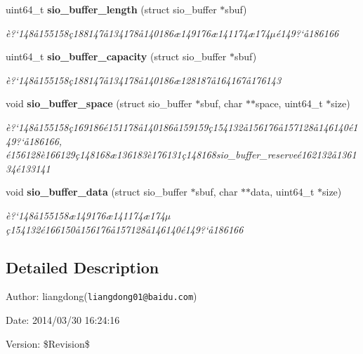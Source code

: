 \begin{CompactItemize}
uint64\_\-t {\bf sio\_\-buffer\_\-length} (struct sio\_\-buffer $\ast$sbuf)
\begin{CompactList}\small\item\em \`{e}?`148\aa{}155158\c{c}188147\aa{}134178\aa{}140186\ae{}149176\ae{}141174\ae{}174$\mu$\'{e}149?`\aa{}186166 \item\end{CompactList}\item 
uint64\_\-t {\bf sio\_\-buffer\_\-capacity} (struct sio\_\-buffer $\ast$sbuf)
\begin{CompactList}\small\item\em \`{e}?`148\aa{}155158\c{c}188147\aa{}134178\aa{}140186\ae{}128187\aa{}164167\aa{}176143 \item\end{CompactList}\item 
void {\bf sio\_\-buffer\_\-space} (struct sio\_\-buffer $\ast$sbuf, char $\ast$$\ast$space, uint64\_\-t $\ast$size)
\begin{CompactList}\small\item\em \`{e}?`148\aa{}155158\c{c}169186\'{e}151178\aa{}140186\aa{}159159\c{c}154132\aa{}156176\aa{}157128\aa{}146140\'{e}149?`\aa{}186166, \'{e}156128\`{e}166129\c{c}148168\ae{}136183\`{e}176131\c{c}148168sio\_\-buffer\_\-reserve\'{e}162132\aa{}136134\'{e}133141 \item\end{CompactList}\item 
void {\bf sio\_\-buffer\_\-data} (struct sio\_\-buffer $\ast$sbuf, char $\ast$$\ast$data, uint64\_\-t $\ast$size)
\begin{CompactList}\small\item\em \`{e}?`148\aa{}155158\ae{}149176\ae{}141174\ae{}174$\mu$\c{c}154132\'{e}166150\aa{}156176\aa{}157128\aa{}146140\'{e}149?`\aa{}186166 \item\end{CompactList}\end{CompactItemize}


\subsection{Detailed Description}
\begin{Desc}
\item[Author:]liangdong({\tt liangdong01@baidu.com}) \end{Desc}
\begin{Desc}
\item[Date:]2014/03/30 16:24:16 \end{Desc}
\begin{Desc}
\item[Version:]\$Revision\$ \end{Desc}



